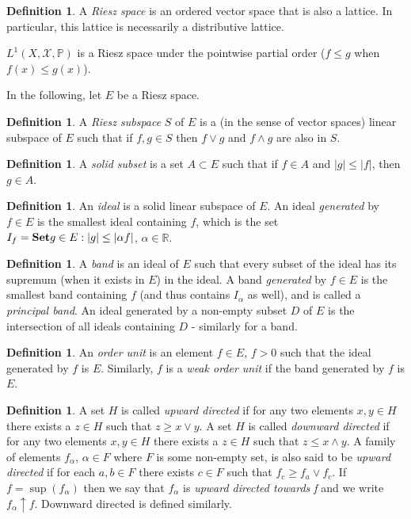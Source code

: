 \documentclass[letterpaper,10pt,oneside,onecolumn,reqno]{amsart}
\renewcommand{\P}{\mathbb P}
\newcommand{\R}{\mathbb R}
\newcommand{\X}{\mathcal X}
\theoremstyle{definition}
\newtheorem{defn}[thm]{Definition}
\newcommand{\catname}[1]{{\normalfont\textbf{#1}}}
\newcommand{\Set}{\catname{Set}}
\newcommand{\meet}{\wedge}
\newcommand{\join}{\vee}
\begin{document}
\begin{defn}\label{def:7}
  A \emph{Riesz space} is an ordered vector space that is also a lattice. In particular, this lattice is necessarily a distributive lattice.

$L^1(X,\X,\P)$ is a Riesz space under the pointwise partial order ($f \leq g$ when $f(x) \leq g(x)$).

\end{defn}
In the following, let $E$ be a Riesz space.

\begin{defn}\label{def:8}
A \emph{Riesz subspace} $S$ of $E$ is a (in the sense of vector spaces) linear subspace of $E$ such that if $f,g \in S$ then $f \join g$ and $f \meet g$ are also in $S$.
\end{defn}

\begin{defn}\label{def:9}
 A \emph{solid subset} is a set $A \subset E$ such that if $f \in A$ and $|g| \leq |f|$, then $g \in A$.
\end{defn}

\begin{defn}\label{def:10}
An \emph{ideal} is a solid linear subspace of $E$. An ideal \emph{generated} by $f\in E$ is the smallest ideal containing $f$, which is the set $I_{f} = \Set{g \in E: |g| \leq |\alpha f|}$, $\alpha \in \R$. 
\end{defn}

\begin{defn}\label{def:11}
A \emph{band} is an ideal of $E$ such that every subset of the ideal has its supremum (when it exists in $E$) in the ideal. A band \emph{generated} by $f\in E$ is the smallest band containing $f$ (and thus contains $I_{\alpha}$ as well), and is called a \emph{principal band}. An ideal generated by a non-empty subset $D$ of $E$ is the intersection of all ideals containing $D$ - similarly for a band.
\end{defn}

\begin{defn}\label{def:12}
An \emph{order unit} is an element $f \in E$, $f > 0$ such that the ideal generated by $f$ is $E$. Similarly, $f$ is a \emph{weak order unit} if the band generated by $f$ is $E$.
\end{defn}


\begin{defn}\label{def:13}
A set $H$ is called \emph{upward directed} if for any two elements $x,y \in H$ there exists a $z \in H$ such that $z \geq x \join y$. A set $H$ is called \emph{downward directed} if for any two elements $x,y \in H$ there exists a $z \in H$ such that $z \leq x \meet y$. A family of elements $f_{\alpha}$, $\alpha \in F$ where $F$ is some non-empty set, is also said to be \emph{upward directed} if for each $a,b \in F$ there exists $c \in F$ such that $f_c \geq f_a \join f_c$. If $f = \sup({f_\alpha})$ then we say that $f_{\alpha}$ is \emph{upward directed towards f} and we write $f_{\alpha}\uparrow f$. Downward directed is defined similarly. 
\end{defn}
\end{document}
